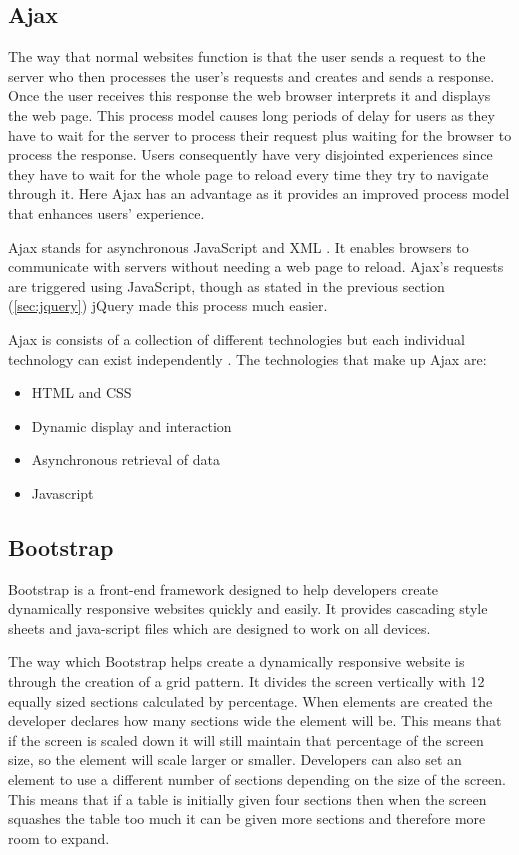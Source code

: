 \documentclass[11pt]{report}
\begin{document}
\subsection{Ajax}
The way that normal websites function is that the user sends a request to the server who then processes the user's requests and creates and sends a response. Once  the user receives this response the web browser interprets it and displays the web page\cite{smith_simplifying_2006-1}. This process model causes long periods of delay for users as they have to wait for the server to process their request plus waiting for the browser to process the response. Users consequently have very disjointed experiences since they have to wait for the whole page to reload every time they try to navigate through it. Here Ajax has an advantage as it provides an improved process model that enhances users' experience.  

 Ajax stands for asynchronous JavaScript and XML \cite{jquery.org_ajax_????}. It enables browsers to communicate with servers without needing a web page to reload. Ajax's requests are triggered using JavaScript, though as stated in the previous section (\ref{sec:jquery}) jQuery made this process much easier.  
 
 Ajax is consists of a collection of different technologies but each individual technology can exist independently \cite{garrett_ajax:_2005}. The technologies that make up Ajax are:
 
 \singlespacing
 \begin{itemize}
 \item HTML and CSS
 \item Dynamic display and interaction
 \item Asynchronous retrieval of data
 \item Javascript
 \end{itemize}
 \doublespacing


\subsection{Bootstrap}
Bootstrap is a front-end framework \cite{_bootstrap_????-1} designed to help developers create dynamically responsive websites quickly and easily. It provides cascading style sheets and java-script files which are designed to work on all devices.

The way which Bootstrap helps create a dynamically responsive website is through the creation of a grid pattern. It divides the screen vertically with 12 equally sized sections calculated by percentage. When elements are created the developer declares how many sections wide the element will be. This means that if the screen is scaled down it will still maintain that percentage of the screen size, so the element will scale larger or smaller. Developers can also set an element to use a different number of sections depending on the size of the screen. This means that if a table is initially given four sections then when the screen squashes the table too much it can be given more sections and therefore more room to expand.
\end{document}
